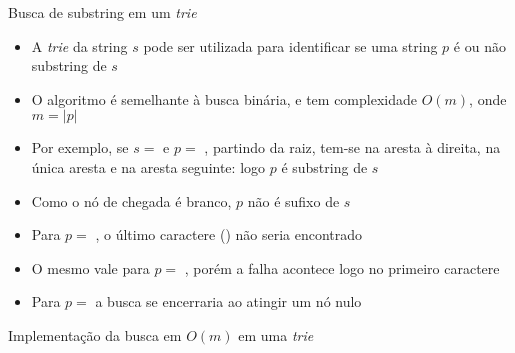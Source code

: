 \begin{frame}[fragile]{Busca de substring em um {\it trie}}

    \begin{itemize}
        \item A \textit{trie} da string $s$ pode ser utilizada para identificar se uma string 
            $p$ é ou não substring de $s$

        \item O algoritmo é semelhante à busca binária, e tem complexidade $O(m)$, onde $m = |p|$

        \item Por exemplo, se $s = $  e $p = $ , partindo da 
            raiz, tem-se  na aresta à direita,  na única 
            aresta e  na aresta seguinte: logo $p$ é substring de $s$

        \item Como o nó de chegada é branco, $p$ não é sufixo de $s$

        \item Para $p =$ , o último caractere () não seria 
            encontrado

        \item O mesmo vale para $p = $ , porém a falha acontece logo no primeiro 
            caractere

        \item Para $p = $  a busca se encerraria ao atingir um nó nulo

    \end{itemize}

\end{frame}

\begin{frame}[fragile]{Implementação da busca em $O(m)$ em uma {\it trie}}
\end{frame}

